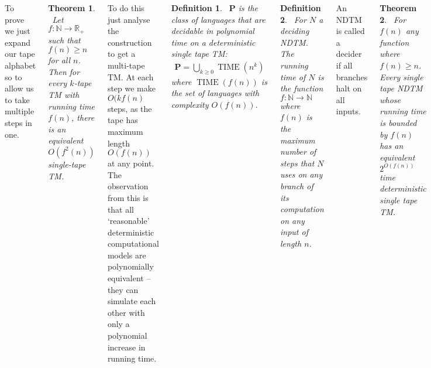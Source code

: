 \documentclass{tikzposter} %
\DeclareMathOperator{\TIME}{TIME}
\newtheorem{theorem}{Theorem}
\newtheorem{definition}{Definition}
\begin{document}
\begin{columns}
{{        To prove we just expand our tape alphabet so to allow us to take multiple steps in one. \\

        \begin{theorem} \ Let $f : \mathbb{N} \to \mathbb{R}_{+}$ such that $f(n) \ge n$ for all $n$. Then for every $k$-tape TM with running time $f(n)$, there is an equivalent $O(f^{2}(n))$ single-tape TM.
        \end{theorem}
        \hphantom{}

        To do this just analyse the construction to get a multi-tape TM. At each step we make $O(kf(n)$ steps, as the tape has maximum length $O(f(n))$ at any point. \\

        The observation from this is that all `reasonable' deterministic computational models are polynomially equivalent -- they can simulate each other with only a polynomial increase in running time. \\

        \begin{definition}
        \ $\mathbf{P}$ is the class of languages that are decidable in polynomial time on a deterministic single tape TM:
        \begin{align*}
        \mathbf{P} = \bigcup_{k \ge 0} \TIME(n^{k})
        \end{align*}
        where $\TIME(f(n))$ is the set of languages with complexity $O(f(n))$.
        \end{definition}
        \hphantom{}

        \begin{definition}
        \ For $N$ a deciding NDTM. The running time of $N$ is the function $f : \mathbb{N} \to \mathbb{N}$ where $f(n)$ is the maximum number of steps that $N$ uses on any branch of its computation on any input of length $n$.
        \end{definition}
        \hphantom{}

        An NDTM is called a decider if all branches halt on all inputs. \\

        \begin{theorem}
        \ For $f(n)$ any function where $f(n) \ge n$. Every single tape NDTM whose running time is bounded by $f(n)$ has an equivalent $2^{O(f(n))}$ time deterministic single tape TM.
        \end{theorem}
        \hphantom{}

}}
\end{columns}
\end{document}

